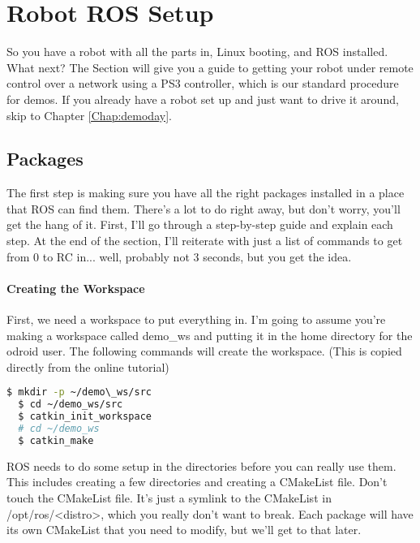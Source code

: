 
\chapter{Robot ROS Setup}
\label{chap:rossetup}

So you have a robot with all the parts in, Linux booting, and ROS installed. What next? The Section will give you a guide to getting your robot under remote control over a network using a PS3 controller, which is our standard procedure for demos. If you already have a robot set up and just want to drive it around, skip to Chapter \ref{Chap:demoday}.

\section{Packages}

The first step is making sure you have all the right packages installed in a place that ROS can find them. There's a lot to do right away, but don't worry, you'll get the hang of it. First, I'll go through a step-by-step guide and explain each step. At the end of the section, I'll reiterate with just a list of commands to get from 0 to RC in... well, probably not 3 seconds, but you get the idea.

\subsubsection{Creating the Workspace}

First, we need a workspace to put everything in. I'm going to assume you're making a workspace called demo\_ws and putting it in the home directory for the odroid user. The following commands will create the workspace. (This is copied directly from the online tutorial)

\begin{lstlisting}[language=bash]
  $ mkdir -p ~/demo\_ws/src
  $ cd ~/demo_ws/src
  $ catkin_init_workspace
  # cd ~/demo_ws
  $ catkin_make
\end{lstlisting}

ROS needs to do some setup in the directories before you can really use them. This includes creating a few directories and creating a CMakeList file. Don't touch the CMakeList file. It's just a symlink to the CMakeList in /opt/ros/<distro>, which you really don't want to break. Each package will have its own CMakeList that you need to modify, but we'll get to that later.


